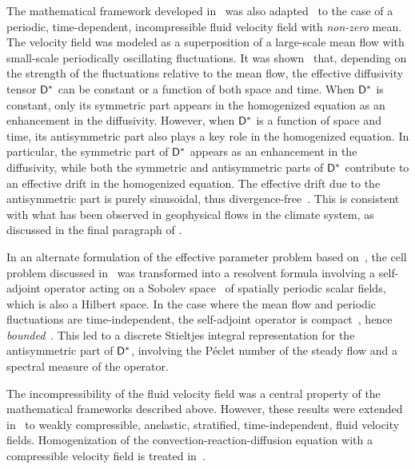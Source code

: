 \documentclass[amsa]{ipart}
\begin{document}
The mathematical framework developed in~\cite{McLaughlin:SIAM_JAM:780}
was also
adapted~\cite{Pavliotis:PHD_Thesis,Majda:Kramer:1999:book} 
to the case of a periodic, 
time-dependent, incompressible fluid velocity field with \emph{non-zero}
mean. The velocity field was modeled as a superposition of a
large-scale mean flow with small-scale periodically oscillating 
fluctuations. It was shown~\cite{Pavliotis:PHD_Thesis} that, depending
on the strength of the fluctuations relative to the mean flow, the
effective diffusivity tensor $\mathsf{D}^*$ can be constant or a function of
both space and time. When $\mathsf{D}^*$ is
constant, only its symmetric part 
appears in the homogenized equation as an enhancement in the
diffusivity. However, when $\mathsf{D}^*$ is a function of space and time,
its antisymmetric part also plays a key role in the homogenized
equation. In particular, the symmetric part of $\mathsf{D}^*$ appears as an
enhancement in the diffusivity, while both the symmetric and
antisymmetric parts of $\mathsf{D}^*$ contribute to an effective drift in the
homogenized equation. The effective drift due to the antisymmetric
part is purely sinusoidal, thus
divergence-free~\cite{Pavliotis:PHD_Thesis}. This is consistent with
what has been observed in geophysical flows in the climate system, as
discussed in the final paragraph of
. 


In an alternate formulation of the effective parameter problem based  
on~\cite{Bhattacharya:AAP:1999:951}, the cell problem discussed 
in~\cite{Pavliotis:PHD_Thesis} was transformed into a resolvent formula
involving a self-adjoint operator acting on a Sobolev
space~\cite{McOwen:2003:PDE,Folland:95:PDEs} of spatially periodic scalar
fields, which is also a Hilbert space. In the case where the mean flow
and periodic fluctuations are time-independent, the
self-adjoint operator is compact~\cite{Bhattacharya:AAP:1999:951},
hence \emph{bounded}~\cite{Stakgold:BVP:2000}. This led to a
discrete Stieltjes integral representation for the
antisymmetric part of $\mathsf{D}^*$, involving the P{\'e}clet number of the
steady flow and a spectral measure of the operator.    



The incompressibility of the fluid velocity field was a central
property of the mathematical frameworks described above. However,
these results were extended in~\cite{McLaughlin:Forest:PF:1999:880}
to weakly compressible, anelastic, stratified, time-independent,
fluid velocity fields. Homogenization of the
convection-reaction-diffusion equation with a compressible velocity
field is treated in~\cite{Papanicolaou:1995:Diff_Rand_Media}.   
\end{document}
